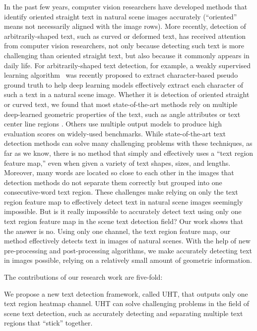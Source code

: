 \documentclass[10pt,twocolumn,letterpaper]{article}
\begin{document}
In the past few years, computer vision researchers have developed methods that  identify oriented straight text in natural scene images accurately \cite{DBLP:journals/corr/HeZYL17, DBLP:journals/corr/abs-1802-08948, DBLP:journals/corr/YaoBSZZC16, 
DBLP:journals/corr/ZhangZSYLB16, east} (``oriented'' means not necessarily aligned with the image rows).  More recently, detection of arbitrarily-shaped text, such as curved or deformed text, has received attention from computer vision researchers, not only because detecting such text is more challenging than oriented straight text, but also because it commonly appears in daily life. 
For arbitrarily-shaped text detection, for example, a weakly supervised learning algorithm~\cite{craft} was recently proposed to extract character-based pseudo ground truth to help deep learning models effectively extract each character of such a text in a natural scene image.  Whether it is detection of oriented straight or curved text, we found that most state-of-the-art methods rely on multiple deep-learned geometric properties of the text,  such as angle attributes \cite{textsnake, east} or text center line regions \cite{lomo-ms}. Others use multiple output models \cite{lomo-ms} to produce high evaluation scores on widely-used benchmarks.  
While state-of-the-art text detection methods can solve many challenging problems with these techniques, as far as we know, there is no method that simply and effectively uses a ``text region feature map,'' even when given a variety of text shapes, sizes, and lengths.  Moreover, many words are located so close to each other in the images that detection methods do not separate them correctly but grouped into one consecutive-word text region.  These challenges make relying on only the text region feature map to effectively detect text in natural scene images seemingly impossible. But is it really impossible to accurately detect text using only one text region feature map in the scene text detection field?  Our work shows that the answer is no.
Using only one channel, the text region feature map, 
our method effectively detects text in images of natural scenes. With the help of new pre-processing and post-processing algorithms, we make accurately detecting text in images possible, relying on a relatively small amount of geometric information. 


The contributions of our research work are five-fold:

 We propose a new text detection framework, called UHT, that outputs only one text region heatmap channel. 
UHT can solve challenging problems in the field of scene text detection, such as accurately detecting and separating multiple text regions that ``stick'' together.
\end{document}
